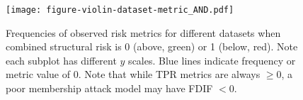 \begin{figure}[p]
    \centering
    \texttt{[image: figure-violin-dataset-metric\_AND.pdf]}
    \caption{Frequencies of observed risk metrics for different datasets when combined structural risk is 0 (above, green) or 1 (below, red). Note each subplot has different $y$ scales. Blue lines indicate frequency or metric value of 0. Note that while TPR metrics are always $\ge 0$, a poor membership attack model may have FDIF $<0$.}%
    \label{fig:violin-dataset-metric}
\end{figure}
